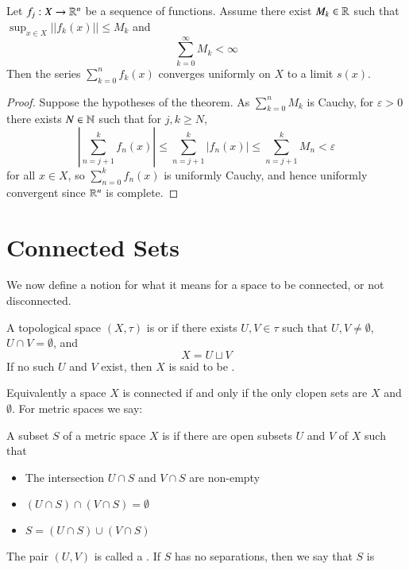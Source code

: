 \begin{namthm}
    Let $f_j:X\rightarrow \mathbb R^n$ be a sequence of functions. Assume there exist $M_k \in \mathbb R$ such that $\sup_{x\in X}||f_k(x)|| \leq M_k$ and $$\sum_{k=0}^{\infty}M_k < \infty$$ Then the series $\sum_{k=0}^nf_k(x)$ converges uniformly on $X$ to a limit $s(x)$.
\end{namthm}
\begin{proof}
    Suppose the hypotheses of the theorem. As $\sum_{k=0}^nM_k$ is Cauchy, for $\varepsilon >0$ there exists $N \in \mathbb N$ such that for $j,k \geq N$, $$\left|\sum_{n=j+1}^kf_n(x)\right|\leq \sum_{n=j+1}^k|f_n(x)| \leq \sum_{n=j+1}^kM_n < \varepsilon$$ for all $x \in X$, so $\sum_{n=0}^kf_n(x)$ is uniformly Cauchy, and hence uniformly convergent since $\mathbb R^n$ is complete.
\end{proof}


\section{Connected Sets}


We now define a notion for what it means for a space to be connected, or not disconnected.

\begin{defn}
    A topological space $(X,\tau)$ is  or  if there exists $U,V \in \tau$ such that $U,V\neq \emptyset$, $U\cap V = \emptyset$, and $$X = U\sqcup V$$
    If no such $U$ and $V$ exist, then $X$ is said to be .
\end{defn}

Equivalently a space $X$ is connected if and only if the only clopen sets are $X$ and $\emptyset$. For metric spaces we say:

\begin{defn}
    A subset $S$ of a metric space $X$ is  if there are open subsets $U$ and $V$ of $X$ such that \begin{itemize}
        \item The intersection $U\cap S$ and $V\cap S$ are non-empty
        \item $(U\cap S) \cap (V\cap S) = \emptyset$
        \item $S = (U\cap S)\cup(V\cap S)$
    \end{itemize}
    The pair $(U,V)$ is called a . If $S$ has no separations, then we say that $S$ is 
\end{defn}


